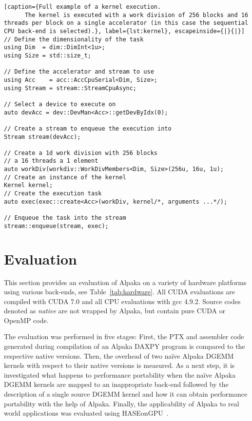 \documentclass[10pt, twocolumn]{article}
\newcommand{\alpaka}{Alpaka\xspace}
\newcommand{\cuda}{{CUDA}\xspace}
\newcommand{\openmp}{{OpenMP}\xspace}
\newcommand{\naive}{na\"ive\xspace}
\begin{document}
\begin{minipage}{\linewidth}
\hfill
\begin{lstlisting}[caption={Full example of a kernel execution.
      The kernel is executed with a work division of 256 blocks and 16 threads per block on a single accelerator (in this case the sequential CPU back-end is selected).}, label={lst:kernel}, escapeinside={|}{|}]
// Define the dimensionality of the task
using Dim  = dim::DimInt<1u>;
using Size = std::size_t;

// Define the accelerator and stream to use
using Acc    = acc::AccCpuSerial<Dim, Size>;
using Stream = stream::StreamCpuAsync;

// Select a device to execute on
auto devAcc = dev::DevMan<Acc>::getDevByIdx(0);

// Create a stream to enqueue the execution into
Stream stream(devAcc);

// Create a 1d work division with 256 blocks
// a 16 threads a 1 element
auto workDiv(workdiv::WorkDivMembers<Dim, Size>(256u, 16u, 1u);
// Create an instance of the kernel
Kernel kernel;
// Create the execution task
auto exec(exec::create<Acc>(workDiv, kernel/*, arguments ...*/);

// Enqueue the task into the stream
stream::enqueue(stream, exec);
  \end{lstlisting}
\hfill
\end{minipage}
      \vspace{-2em}


 \section{Evaluation}
This section provides an evaluation of \alpaka on a variety of hardware platforms using various back-ends, see
Table~\ref{tab:hardware}.
All \cuda evaluations are compiled with \cuda 7.0 and all CPU evaluations with gcc 4.9.2.
Source codes denoted as \emph{native} are not wrapped by \alpaka, but contain pure \cuda or \openmp code.

The evaluation was performed in five stages:
First, the PTX and assembler code generated during compilation of an \alpaka DAXPY program is compared to the respective native versions.
Then, the overhead of two \naive \alpaka DGEMM kernels with respect to their native versions is measured.
As a next step, it is investigated what happens to performance portability when the \naive \alpaka DGEMM kernels are mapped to an inappropriate back-end followed by the description of a single source DGEMM kernel and how it can obtain performance portability with the help of \alpaka.
Finally, the applicability of \alpaka to real world applications was evaluated using HASEonGPU~\cite{haseongpu}.
\end{document}

